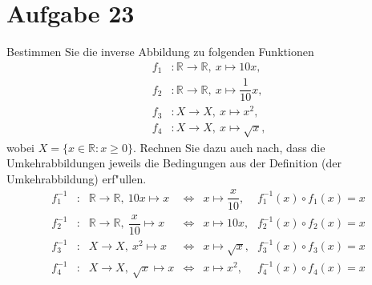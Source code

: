 \section{Aufgabe 23}
\setcounter{section}{23}

Bestimmen Sie die inverse Abbildung zu folgenden Funktionen
\begin{equation*}
    \begin{aligned}
        f_1 &: \mathbb{R} \rightarrow \mathbb{R},\ x \mapsto 10x \text{,} \\[5pt]
        f_2 &: \mathbb{R} \rightarrow \mathbb{R},\ x \mapsto \dfrac{1}{10}x \text{,} \\[5pt]
        f_3 &: X \rightarrow X,\ x \mapsto x^2 \text{,} \\[5pt]
        f_4 &: X \rightarrow X,\ x \mapsto \sqrt{x} \text{,}
    \end{aligned}
\end{equation*}
wobei $X = \{x \in \mathbb{R} : x \geq 0 \}$. Rechnen Sie dazu auch nach, dass
die Umkehrabbildungen jeweils die Bedingungen aus der Definition (der
Umkehrabbildung) erf"ullen.
\begin{equation*}
    \begin{array}{rccccl}
        f_1^{-1} &:& \mathbb{R} \rightarrow \mathbb{R},\ 10x \mapsto x           &\iff& x \mapsto \dfrac{x}{10} \text{,} & f_1^{-1}(x) \circ f_1(x) = x \\[10pt]
        f_2^{-1} &:& \mathbb{R} \rightarrow \mathbb{R},\ \dfrac{x}{10} \mapsto x &\iff& x \mapsto 10x           \text{,} & f_2^{-1}(x) \circ f_2(x) = x \\[10pt]
        f_3^{-1} &:& X \rightarrow X,\ x^2 \mapsto x                             &\iff& x \mapsto \sqrt{x}      \text{,} & f_3^{-1}(x) \circ f_3(x) = x \\[10pt]
        f_4^{-1} &:& X \rightarrow X,\ \sqrt{x} \mapsto x                        &\iff& x \mapsto x^2           \text{,} & f_4^{-1}(x) \circ f_4(x) = x
    \end{array}
\end{equation*}
